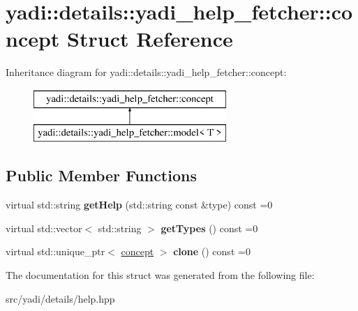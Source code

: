\hypertarget{structyadi_1_1details_1_1yadi__help__fetcher_1_1concept}{}\section{yadi\+:\+:details\+:\+:yadi\+\_\+help\+\_\+fetcher\+:\+:concept Struct Reference}
\label{structyadi_1_1details_1_1yadi__help__fetcher_1_1concept}
Inheritance diagram for yadi\+:\+:details\+:\+:yadi\+\_\+help\+\_\+fetcher\+:\+:concept\+:\begin{figure}[H]
\begin{center}
\leavevmode
\includegraphics[height=2.000000cm]{structyadi_1_1details_1_1yadi__help__fetcher_1_1concept}
\end{center}
\end{figure}
\subsection*{Public Member Functions}
\begin{DoxyCompactItemize}
\item 
\mbox{\label{structyadi_1_1details_1_1yadi__help__fetcher_1_1concept_ae1dab24d74d79eb7b385509d5628b402}} 
virtual std\+::string {\bfseries get\+Help} (std\+::string const \&type) const =0
\item 
\mbox{\label{structyadi_1_1details_1_1yadi__help__fetcher_1_1concept_ac61809b7604489e5176a2d0f8ad3e776}} 
virtual std\+::vector$<$ std\+::string $>$ {\bfseries get\+Types} () const =0
\item 
\mbox{\label{structyadi_1_1details_1_1yadi__help__fetcher_1_1concept_a2d55ab2f5201a53381743ffc59119057}} 
virtual std\+::unique\+\_\+ptr$<$ \hyperlink{structyadi_1_1details_1_1yadi__help__fetcher_1_1concept}{concept} $>$ {\bfseries clone} () const =0
\end{DoxyCompactItemize}


The documentation for this struct was generated from the following file\+:\begin{DoxyCompactItemize}
\item 
src/yadi/details/help.\+hpp\end{DoxyCompactItemize}
